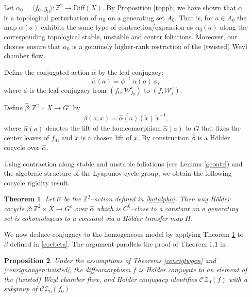 \documentclass[11pt]{amsart}
\numberwithin{equation}{section}
\newcommand{\Z}{\mathbb{Z}}
\newcommand{\CZ}{\mathcal{CZ}}
\theoremstyle{plain}
\newtheorem{thm}{Theorem}[section]
\newtheorem{prop}[thm]{Proposition}
\begin{document}
Let $\alpha_0=\langle f_0,g_0\rangle:\Z^2\to\mathrm{Diff}(X)$. By Proposition \ref{topph} we have shown that $\alpha$ is a
topological perturbation of $\alpha_0$ on a generating set $A_0$. That is, for $a\in A_0$ the
map $\alpha(a)$ exhibits the same type of contraction/expansion as
$\alpha_0(a)$ along the corresponding topological stable, unstable and
center foliations. Moreover, our choices ensure that $\alpha_0$ is a
genuinely higher‑rank restriction of the (twisted) Weyl chamber flow.

Define the conjugated action $\hat\alpha$ by the leaf conjugacy:
\begin{equation}\label{hatalpha}
\hat\alpha(a)=\phi^{-1}\,\alpha(a)\,\phi,
\end{equation}
where $\phi$ is the leaf conjugacy from $(f_0,\mathcal W^c_{f_0})$ to
$(f,\mathcal W^c_{f})$.



Define $\hat\beta:\Z^2\times X\to G^c$ by
\begin{equation}\label{cocbeta}
\hat\beta(a,x)=\widetilde{\hat\alpha(a)}(\tilde x)\,\tilde x^{-1},
\end{equation}
where $\widetilde{\hat\alpha(a)}$ denotes the lift of the homeomorphism
$\hat\alpha(a)$ to $G$ that fixes the center leaves of $f_0$, and
$\tilde x$ is a chosen lift of $x$. By construction $\hat\beta$ is a
Hölder cocycle over $\hat\alpha$.

Using contraction along stable and unstable foliations (see Lemma
\ref{gcontr}) and the algebraic structure
of the Lyapunov cycle group, we obtain the following cocycle rigidity
result.

\begin{thm}\label{cocrig}
Let $\hat\alpha$ be the $\Z^2$–action defined in
\eqref{hatalpha}. Then any Hölder cocycle
$\beta:\Z^2\times X\to G^c$ over $\hat\alpha$ which is $C^0$–close
to a constant on a generating set is cohomologous to a constant via a
H\"older transfer map $H$.
\end{thm}

We now deduce conjugacy to the homogeneous model by applying Theorem
\ref{cocrig} to $\hat\beta$ defined in \eqref{cocbeta}. The argument
parallels the proof of Theorem 1.1 in \cite{DK}.

\begin{prop}\label{prop:fholconj}
Under the assumptions of Theorems \ref{cenrigtwgen} and 
\ref{cenrignongen:twisted}, the diffeomorphism
$f$ is Hölder conjugate to an element of the (twisted) Weyl chamber flow, and H\"older conjugacy identifies $\CZ_0(f)$ with a subgroup of $\CZ_0(f_0)$.
\end{prop}
\end{document}
